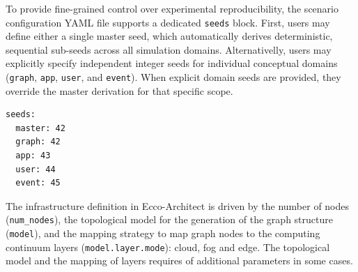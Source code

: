 \documentclass[ASNA]{USG} %
\begin{document}
To provide fine-grained control over experimental reproducibility, the scenario configuration YAML file supports a dedicated \texttt{seeds} block. First, users may define either a single master seed, which automatically derives deterministic, sequential sub-seeds across all simulation domains. Alternativelly, users may explicitly specify independent integer seeds for individual conceptual domains (\texttt{graph}, \texttt{app}, \texttt{user}, and \texttt{event}). When explicit domain seeds are provided, they override the master derivation for that specific scope.

\begin{lstlisting}[caption={YAML configuration for stochastic experimental reproductibility through seeds definition.},label=lst:user_event, basicstyle=\fontsize{8}{10}\selectfont\ttfamily]
seeds:
  master: 42
  graph: 42
  app: 43
  user: 44
  event: 45
\end{lstlisting}



\label{anex:infrastructuredefinition}
The infrastructure definition in Ecco-Architect is driven by the number of nodes (\texttt{num\_nodes}), the topological model for the generation of the graph structure (\texttt{model}), and the mapping strategy to map graph nodes to the computing continuum layers (\texttt{model.layer.mode}): cloud, fog and edge. The topological model and the mapping of layers requires of additional parameters in some cases. 
\end{document}
